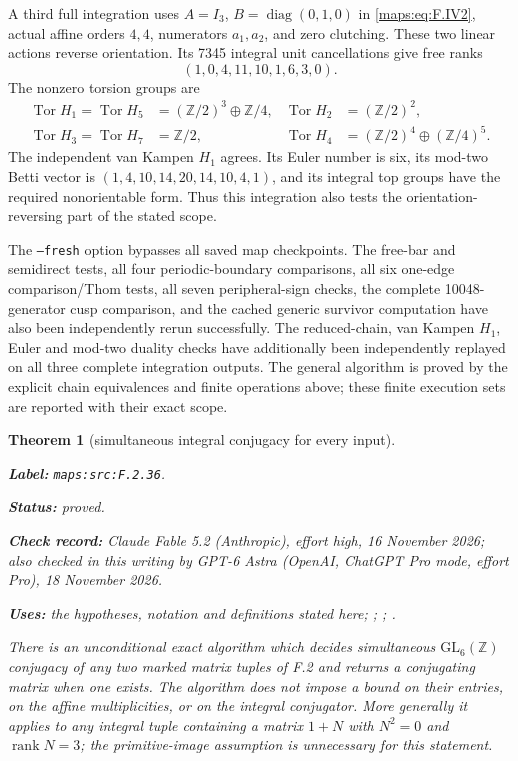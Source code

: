 \documentclass[11pt,a4paper]{article}
\newtheorem{theorem}{Theorem}[section]
\theoremstyle{definition}
\newcommand{\StatementRecord}[4]{\par\smallskip\begingroup\upshape\raggedright\noindent\textbf{Label:} \nolinkurl{#1}.\par\noindent\textbf{Status:} #2.\par\noindent\textbf{Check record:} #3.\par\noindent\textbf{Uses:} #4.\par\endgroup\smallskip}
\newcommand{\CurrentChecker}{GPT-6 Astra (OpenAI, ChatGPT Pro mode, effort Pro), 18 November 2026}
\begin{document}
A third full integration uses
$A=I_3$, $B=\operatorname{diag}(0,1,0)$ in \eqref{maps:eq:F.IV2},
actual affine orders $4,4$, numerators $a_1,a_2$, and zero
clutching.  These two linear actions reverse orientation.
Its 7345 integral unit cancellations give free ranks
\[
                  (1,0,4,11,10,1,6,3,0).
\]
The nonzero torsion groups are
\[
\begin{aligned}
 \operatorname{Tor}H_1=\operatorname{Tor}H_5
       &=(\mathbb Z/2)^3\oplus\mathbb Z/4,&
 \operatorname{Tor}H_2&=(\mathbb Z/2)^2,\\
 \operatorname{Tor}H_3=\operatorname{Tor}H_7
       &=\mathbb Z/2,&
 \operatorname{Tor}H_4&=(\mathbb Z/2)^4\oplus(\mathbb Z/4)^5.
\end{aligned}
\]
The independent van Kampen $H_1$ agrees.  Its Euler number
is six, its mod-two Betti vector is
$(1,4,10,14,20,14,10,4,1)$, and its integral top groups
have the required nonorientable form.  Thus this integration
also tests the orientation-reversing part of the stated scope.

The \texttt{--fresh} option bypasses all saved map checkpoints.
The free-bar and semidirect tests, all four periodic-boundary
comparisons, all six one-edge comparison/Thom tests, all seven
peripheral-sign checks, the complete 10048-generator cusp
comparison, and the cached generic survivor computation have
also been independently rerun successfully.  The
reduced-chain, van Kampen $H_1$, Euler and mod-two duality
checks have additionally been independently replayed on
all three complete integration outputs.  The general
algorithm is proved by the explicit chain equivalences and
finite operations above; these finite execution sets are
reported with their exact scope.







\begin{theorem}[simultaneous integral conjugacy for every input]\label{maps:src:F.2.36}
\StatementRecord{maps:src:F.2.36}{proved}{Claude Fable 5.2 (Anthropic), effort high, 16 November 2026; also checked in this writing by \CurrentChecker}{the hypotheses, notation and definitions stated here; \cite[Algorithm 8.3, p.~21]{rootBHJ22}; \cite[Algorithm 8.3 and its correctness proof, p.~21]{rootBHJ22}; \cite[Theorem 3.4, p.~6; Propositions 8.1--8.2, p.~21]{rootBHJ22}}


There is an unconditional exact algorithm which decides simultaneous
$\mathrm{GL}_6(\mathbb Z)$ conjugacy of any two marked matrix tuples of
F.2 and returns a conjugating matrix when one exists. The algorithm
does not impose a bound on their entries, on the affine multiplicities,
or on the integral conjugator. More generally it applies to any integral
tuple containing a matrix $1+N$ with $N^2=0$ and $\operatorname{rank}N=3$;
the primitive-image assumption is unnecessary for this statement.

\end{theorem}
\end{document}
